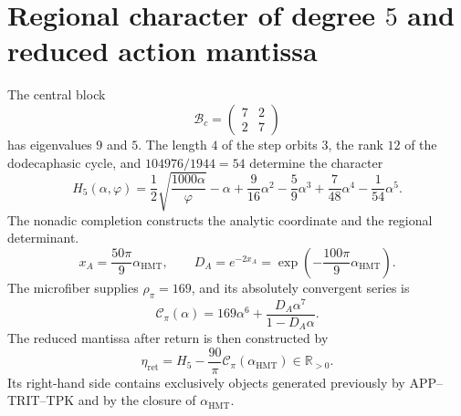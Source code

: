 \section{Regional character of degree \texorpdfstring{\(5\)}{5} and reduced action mantissa}
\label{sec:l9s102:eta-ret}

The central block
\begin{equation}
 \mathcal B_c=\begin{pmatrix}7&2\\2&7\end{pmatrix}
 \label{eq:l9s102:bc-accion}
\end{equation}
has eigenvalues \(9\) and \(5\). The length \(4\) of the step
orbits \(3\), the rank \(12\) of the dodecaphasic cycle, and
\(104976/1944=54\) determine the character
\begin{equation}
 \boxed{
 H_5(\alpha,\varphi)
 =\frac12\sqrt{\frac{1000\alpha}{\varphi}}-\alpha
 +\frac9{16}\alpha^2-\frac59\alpha^3
 +\frac7{48}\alpha^4-\frac1{54}\alpha^5.}
 \label{eq:l9s102:h5}
\end{equation}
The nonadic completion constructs the analytic coordinate and the regional determinant.
\begin{equation}
 x_A=\frac{50\pi}{9}\alpha_{\mathrm{HMT}},
 \qquad
 D_A=e^{-2x_A}
 =\exp\!\left(-\frac{100\pi}{9}\alpha_{\mathrm{HMT}}\right).
 \label{eq:l9s102:xa-da}
\end{equation}
The microfiber supplies \(\rho_\pi=169\), and its absolutely
convergent series is
\begin{equation}
 \mathscr C_\pi(\alpha)
 =169\alpha^6+\frac{D_A\alpha^7}{1-D_A\alpha}.
 \label{eq:l9s102:cpi}
\end{equation}
The reduced mantissa after return is then constructed by
\begin{equation}
 \boxed{
 \eta_{\mathrm{ret}}
 =H_5-\frac{90}{\pi}\mathscr C_\pi(\alpha_{\mathrm{HMT}})
 \in\mathbb R_{>0}.}
 \label{eq:l9s102:eta-ret}
\end{equation}
Its right-hand side contains exclusively objects generated previously
by APP--TRIT--TPK and by the closure of \(\alpha_{\mathrm{HMT}}\).

